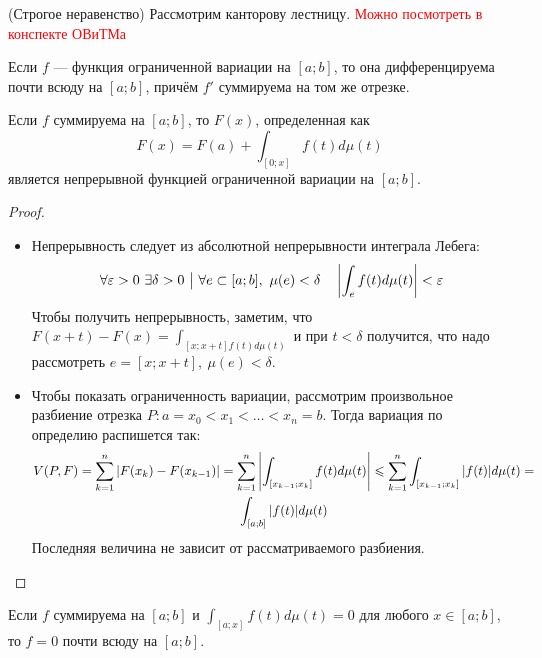 \begin{example} (Строгое неравенство)
	Рассмотрим канторову лестницу. 
	\textcolor{red}{Можно посмотреть в конспекте ОВиТМа}
\end{example}

\begin{corollary}
	Если $f$ --- функция ограниченной вариации на $[a; b]$, то она дифференцируема почти всюду на $[a; b]$, причём $f'$ суммируема на том же отрезке.
\end{corollary}

\begin{lemma} \label{int_lemma}
	Если $f$ суммируема на $[a; b]$, то $F(x)$, определенная как
	\[
		F(x) = F(a) + \int_{[0; x]} f(t)d\mu(t)
	\]
	является непрерывной функцией ограниченной вариации на $[a; b]$.
\end{lemma}

\begin{proof}~
	\begin{itemize}
		\item Непрерывность следует из абсолютной непрерывности интеграла Лебега:
		\[
			\forall \varepsilon > 0\ \exists \delta > 0 \ \big|\  \forall e \subset [a; b],\ \mu(e) < \delta \quad \left|\int_e f(t)d\mu(t)\right| < \varepsilon
		\]
		Чтобы получить непрерывность, заметим, что $F(x + t) - F(x) = \int_{[x; x + t] f(t)d\mu(t)}$ и при $t < \delta$ получится, что надо рассмотреть $e = [x; x + t],\ \mu(e) < \delta$.
		
		\item Чтобы показать ограниченность вариации, рассмотрим произвольное разбиение отрезка $P \colon a = x_0 < x_1 < \ldots < x_n = b$. Тогда вариация по определию распишется так:
		\begin{multline*}
			V(P, F) = \sum_{k = 1}^n |F(x_k) - F(x_{k - 1})| = \sum_{k = 1}^n \left|\int_{[x_{k - 1}; x_k]} f(t)d\mu(t)\right| \leqslant \sum_{k = 1}^n \int_{[x_{k - 1}; x_k]} |f(t)|d\mu(t) =
			\\
			\int_{[a; b]} |f(t)|d\mu(t)
		\end{multline*}
		Последняя величина не зависит от рассматриваемого разбиения.
	\end{itemize}
\end{proof}

\begin{lemma}
	Если $f$ суммируема на $[a; b]$ и $\int_{[a; x]} f(t)d\mu(t) = 0$ для любого $x \in [a; b]$, то $f = 0$ почти всюду на $[a; b]$.
\end{lemma}

